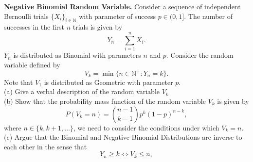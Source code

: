 \begin{exercise}
\textbf{Negative Binomial Random Variable.} Consider a sequence of independent Bernoulli trials \(\{X_i\}_{i \in \mathbb{N}}\) with parameter of success \(p \in (0, 1]\). The number of successes in the first \(n\) trials is given by 
\[
Y_n = \sum_{i=1}^{n} X_i.
\]
\(Y_n\) is distributed as Binomial with parameters \(n\) and \(p\). Consider the random variable defined by 
\[
V_k = \min\{n \in \mathbb{N}^+ : Y_n = k\}.
\]
Note that \(V_1\) is distributed as Geometric with parameter \(p\).\\

(a) Give a verbal description of the random variable \(V_k\)\\

(b) Show that the probability mass function of the random variable \(V_k\) is given by 
\[
P(V_k = n) = \binom{n-1}{k-1} p^k (1 - p)^{n-k},
\]
where \(n \in \{k, k + 1, \ldots\}\), we need to consider the conditions under which \(V_k = n\). \\

(c) Argue that the Binomial and Negative Binomial Distributions are inverse to each other in the sense that
\[
Y_n \geq k \Leftrightarrow V_k \leq n,
\]
\end{exercise}


